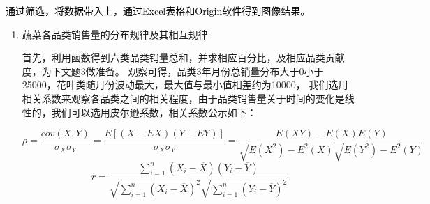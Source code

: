 \documentclass[withoutpreface,bwprint]{cumcmthesis}
\begin{document}
\textcolor{black}{通过筛选，将数据带入上，通过Excel表格和Origin软件得到图像结果。}
\begin{enumerate}
	\item 蔬菜各品类销售量的分布规律及其相互规律

	首先，利用函数得到六类品类销量总和，并求相应百分比，及相应品类贡献度，为下文题3做准备。
观察可得，品类3年月份总销量分布大于0小于25000，花叶类随月份波动最大，最大值与最小值相差约为10000，
我们选用相关系数来观察各品类之间的相关程度，由于品类销售量关于时间的变化是线性的，我们可以选用皮尔逊系数，相关系数公示如下：

$$\rho = \frac{cov(X,Y)}{\sigma_X\sigma_Y}=\frac{E[(X-EX)(Y-EY)]}{\sigma_X\sigma_Y}=\frac{E(XY)-E(X)E(Y)}{\sqrt{E(X^2)-E^2(X)}\sqrt{E(Y^2)-E^2(Y)}}$$
$$r = \frac{\sum_{i=1}^{n}(X_i-\overline{X})(Y_i-\overline{Y})}{\sqrt{\sum_{i=1}^{n}(X_i-\overline{X})^2}\sqrt{\sum_{i=1}^{n}(Y_i-\overline{Y})^2}}$$


\end{enumerate}
\end{document}

